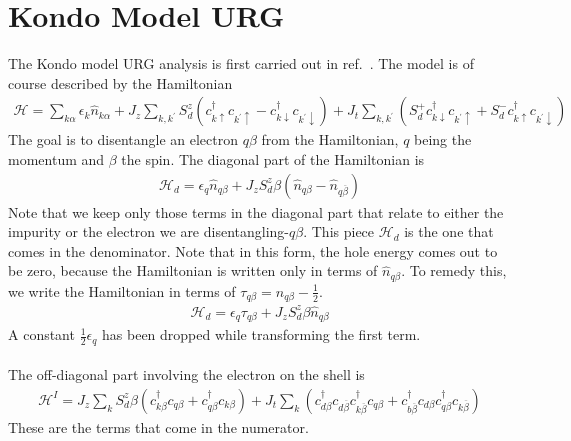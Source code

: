 \documentclass[twoside]{report}
\numberwithin{equation}{section}
\begin{document}
\section{Kondo Model URG}
\label{kondourg}
The Kondo model URG analysis is first carried out in ref.~\cite{am_thesis}. The model is of course described by the Hamiltonian
\begin{equation}\begin{aligned}
	\mathcal{H} = \sum_{k\alpha}\epsilon_{k}\hat n_{k\alpha} + J_z\sum_{k,k^\prime} S_d^z\left(c^\dagger_{k\uparrow}c_{k^\prime\uparrow} - c^\dagger_{k\downarrow}c_{k^\prime\downarrow}\right) + J_t\sum_{k,k^\prime}\left(S_d^+ c^\dagger_{k\downarrow}c_{k^\prime\uparrow} + S_d^- c^\dagger_{k\uparrow}c_{k^\prime\downarrow}\right)
\end{aligned}\end{equation}
The goal is to disentangle an electron \(q\beta\) from the Hamiltonian, \(q\) being the momentum and \(\beta\) the spin. The diagonal part of the Hamiltonian is
\begin{equation}\begin{aligned}
	\mathcal{H}_d = \epsilon_q \hat n_{q\beta} + J_z S_d^z \beta\left(\hat n_{q\beta} - \hat n_{q\overline\beta}\right)
\end{aligned}\end{equation}
Note that we keep only those terms in the diagonal part that relate to either the impurity or the electron we are disentangling-\(q\beta\). This piece \(\mathcal{H}_d\) is the one that comes in the denominator. Note that in this form, the hole energy comes out to be zero, because the Hamiltonian is written only in terms of \(\hat n_{q\beta}\). To remedy this, we write the Hamiltonian in terms of \(\tau_{q\beta} = \hat n_{q\beta} - \frac{1}{2}\).
\begin{equation}\begin{aligned}
	\label{kondodiag}
\mathcal{H}_d = \epsilon_q \tau_{q\beta} + J_z S_d^z \beta \hat n_{q\beta}
\end{aligned}\end{equation}
A constant \(\frac{1}{2} \epsilon_q\) has been dropped while transforming the first term.
\\\\The off-diagonal part involving the electron on the shell is
\begin{equation}\begin{aligned}
	\mathcal{H}^I = J_z\sum_{k}S^z_d\beta\left(c^\dagger_{k\beta}c_{q\beta} +  c^\dagger_{q\beta}c_{k\beta}\right) + J_t \sum_{k}\left(c^\dagger_{d\beta}c_{d\overline\beta} c^\dagger_{k\overline\beta}c_{q\beta} + c^\dagger_{b\overline\beta}c_{d\beta} c^\dagger_{q\beta}c_{k\overline\beta}\right)
\end{aligned}\end{equation}
These are the terms that come in the numerator.
\end{document}
